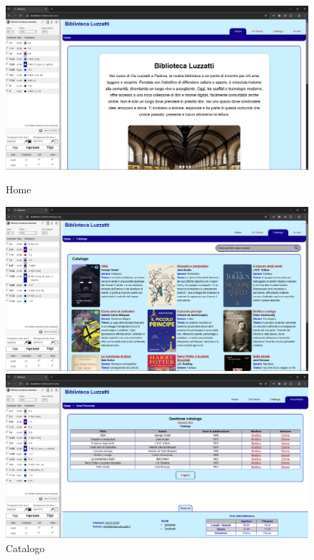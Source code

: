 \documentclass{article}
\begin{document}
\vspace{1cm}

\begin{figure}[H]
    \begin{minipage}[t]{0.5\textwidth}
        \centering
        \includegraphics[width=\textwidth]{./img/home.png}
        \caption{Home}
    \end{minipage}
    \hfill
    \begin{minipage}[t]{0.5\textwidth}
        \centering
        \includegraphics[width=\textwidth]{./img/catalogo.png}
        \caption{Catalogo}
    \end{minipage}
    \hfill
    \begin{minipage}[t]{0.5\textwidth}
        \centering
        \includegraphics[width=\textwidth]{./img/admin.png}

\end{minipage}
\end{figure}
\end{document}
